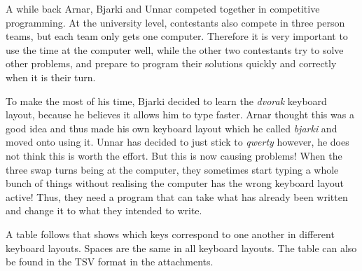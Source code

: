 
A while back Arnar, Bjarki and Unnar competed together in competitive programming. At the university level,
contestants also compete in three person teams, but each team only gets one computer. Therefore it is very
important to use the time at the computer well, while the other two contestants try to solve other problems,
and prepare to program their solutions quickly and correctly when it is their turn.

To make the most of his time, Bjarki decided to learn the \emph{dvorak} keyboard layout, because he believes it
allows him to type faster. Arnar thought this was a good idea and thus made his own keyboard layout which
he called \emph{bjarki} and moved onto using it. Unnar has decided to just stick to \emph{qwerty} however, he does not 
think this is worth the effort. But this is now causing problems! When the three swap turns being at the
computer, they sometimes start typing a whole bunch of things without realising the computer has the wrong
keyboard layout active! Thus, they need a program that can take what has already been written and change it
to what they intended to write.

A table follows that shows which keys correspond to one another in different keyboard layouts. Spaces
are the same in all keyboard layouts. The table can also be found in the TSV format in the attachments.

